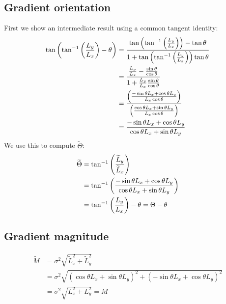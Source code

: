 \documentclass[thesis.tex]{subfiles}
\begin{document}
\subsection{Gradient orientation} \label{apx:rotation_go}
%
First we show an intermediate result using a common tangent identity:
%
\begin{align}
\tan \left( \tan^{-1} \left( \frac{L_y}{L_x} \right) - \theta \right)
&= \frac{\tan \left( \tan^{-1} \left( \frac{L_y}{L_x} \right) \right) - \tan \theta}{1 + \tan \left( \tan^{-1} \left( \frac{L_y}{L_x} \right) \right) \tan \theta} \\
&= \frac{\frac{L_y}{L_x} - \frac{\sin \theta}{\cos \theta}}{1 + \frac{L_y}{L_x} \frac{\sin \theta}{\cos \theta}} \\
&= \frac{\left(\frac{-\sin \theta L_x + \cos \theta L_y}{L_x \cos \theta}\right)}{\left(\frac{\cos \theta L_x + \sin \theta L_y}{L_x \cos \theta}\right)} \\
&= \frac{-\sin \theta L_x + \cos \theta L_y}{\cos \theta L_x + \sin \theta L_y}
\end{align}
%
We use this to compute $\widetilde{\Theta}$:
%
\begin{align}
\widetilde{\Theta} &= \tan^{-1} \left( \frac{\widetilde{L}_y}{\widetilde{L}_x} \right) \\
&= \tan^{-1} \left( \frac{-\sin \theta L_x + \cos \theta L_y}{\cos \theta L_x + \sin \theta L_y} \right) \\
&= \tan^{-1} \left( \frac{L_y}{L_x} \right) - \theta = \Theta - \theta
\end{align}
%
\subsection{Gradient magnitude} \label{apx:rotation_m}
%
\begin{align}
\widetilde{M} &= \sigma^2 \sqrt{\widetilde{L}_x^2 + \widetilde{L}_y^2} \\
&= \sigma^2 \sqrt{(\cos \theta L_x + \sin \theta L_y)^2 + (-\sin \theta L_x + \cos \theta L_y)^2} \\
&= \sigma^2 \sqrt{L_x^2 + L_y^2} = M
\end{align}
%
\end{document}
